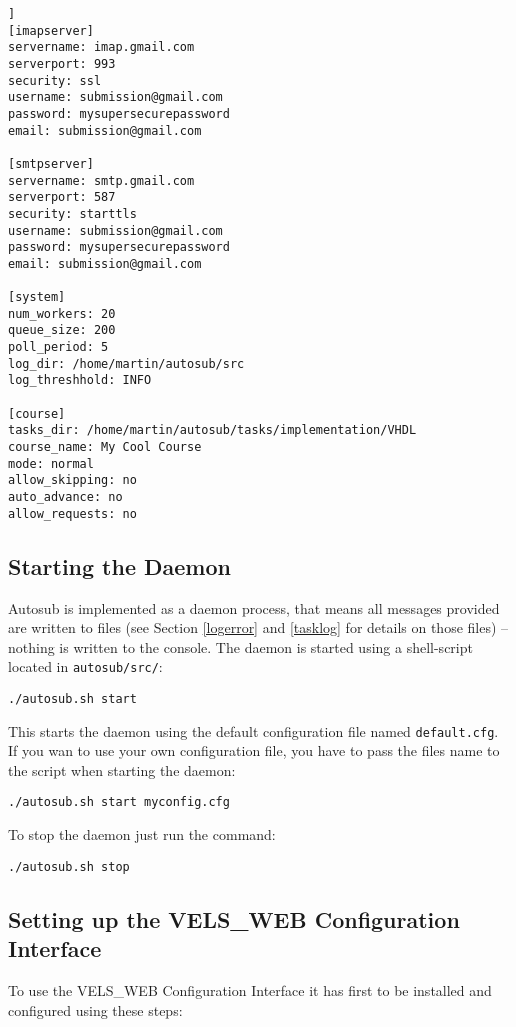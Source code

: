 \begin{lstlisting}[frame=single,captionpos=b,caption=example.cfg, belowcaptionskip=4pt]]
[imapserver]
servername: imap.gmail.com
serverport: 993
security: ssl
username: submission@gmail.com
password: mysupersecurepassword
email: submission@gmail.com

[smtpserver]
servername: smtp.gmail.com
serverport: 587
security: starttls
username: submission@gmail.com
password: mysupersecurepassword
email: submission@gmail.com

[system]
num_workers: 20
queue_size: 200
poll_period: 5
log_dir: /home/martin/autosub/src
log_threshhold: INFO

[course]
tasks_dir: /home/martin/autosub/tasks/implementation/VHDL
course_name: My Cool Course
mode: normal
allow_skipping: no
auto_advance: no
allow_requests: no
\end{lstlisting}

\subsection{Starting the Daemon}

Autosub is implemented as a daemon process, that means all messages provided are written
to files (see Section \ref{logerror} and \ref{tasklog} for details on those files) -- 
nothing is written to the console. The daemon is started using a shell-script located
in {\tt autosub/src/}:

\begin{verbatim}
./autosub.sh start
\end{verbatim}

This starts the daemon using the default configuration file named {\tt default.cfg}. If you
wan to use your own configuration file, you have to pass the files name to the script when
starting the daemon:

\begin{verbatim}
./autosub.sh start myconfig.cfg
\end{verbatim}

To stop the daemon just run the command:

\begin{verbatim}
./autosub.sh stop
\end{verbatim}

\subsection{Setting up the VELS\_WEB Configuration Interface}
To use the VELS\_WEB Configuration Interface it has first to be installed and
configured using these steps:

